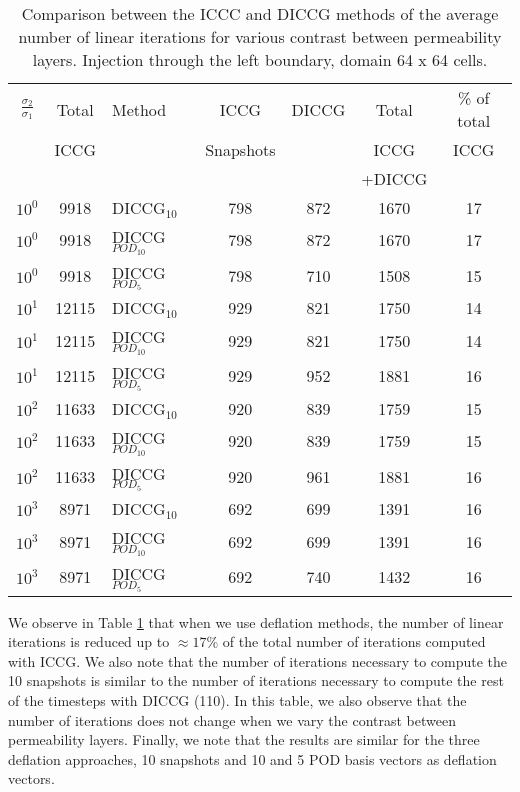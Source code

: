 \documentclass[12pt]{article}
\begin{document}
\begin{table}[!h]\centering
\begin{minipage}{1\textwidth}
 \centering
\begin{tabular}{ ||c|c||l|c|c|c|c||} 
\hline
$\frac{\sigma_2}{\sigma_1}$&Total&Method  & ICCG&DICCG &Total&\% of total\\ 
                           & ICCG     &  & Snapshots& &ICCG& ICCG\\ 
                            &     &  & & &+DICCG& \\
\hline 
$10^{0}$ &9918& DICCG$_{10}$&798&872&1670&17\\ 
\hline  
$10^{0}$ &9918& DICCG$_{POD_{10}}$&798&872&1670&17 \\ 
\hline  
$10^{0}$ &9918& DICCG$_{POD_{5}}$&798&710&1508&15 \\ 
\hline  
$10^{1}$ &12115& DICCG$_{10}$&929&821&1750&14\\ 
\hline  
$10^{1}$ &12115& DICCG$_{POD_{10}}$&929&821&1750&14 \\ 
\hline  
$10^{1}$ &12115& DICCG$_{POD_{5}}$&929&952&1881&16 \\ 
\hline   
$10^{2}$ &11633& DICCG$_{10}$&920&839&1759&15\\ 
\hline  
$10^{2}$ &11633& DICCG$_{POD_{10}}$&920&839&1759&15 \\ 
\hline  
$10^{2}$ &11633& DICCG$_{POD_{5}}$&920&961&1881&16 \\ 
\hline  
$10^{3}$ &8971& DICCG$_{10}$&692&699&1391&16\\ 
\hline  
$10^{3}$ &8971& DICCG$_{POD_{10}}$&692&699&1391&16 \\ 
\hline  
$10^{3}$ &8971& DICCG$_{POD_{5}}$&692&740&1432&16 \\ 
\hline  
\end{tabular} 
\caption{Comparison between the ICCC and DICCG methods of the average number of linear iterations for various contrast between permeability layers. Injection through the left boundary, domain 64 x 64 cells.}\label{table:liter1} 
\end{minipage}  
\end{table}  

We observe in Table \ref{table:liter1} that when we use deflation methods, the number of linear iterations is reduced up to $\approx 17\%$ of the total number of iterations computed with ICCG. We also note that the number of iterations necessary to compute the 10 snapshots is similar to the number of iterations necessary to compute the rest of the timesteps with DICCG (110). In this table, we also observe that the number of iterations does not change when we vary the contrast between permeability layers. Finally, we note that the results are similar for the three deflation approaches, 10 snapshots and 10 and 5 POD basis vectors as deflation vectors. 
\end{document}

